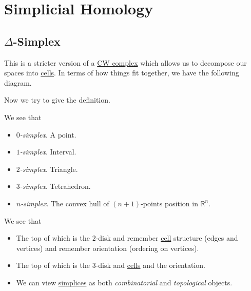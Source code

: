 \section{Simplicial Homology}
\subsection{\(\Delta\)-Simplex}
This is a stricter version of a \hyperref[def:CW-Complex]{CW complex} which allows us to decompose our spaces into \hyperref[def:cell]{cells}.
In terms of how things fit together, we have the following diagram.
\begin{figure}[H]
	\centering
	\label{fig:simplicial-homology-venn-diagram}
\end{figure}

Now we try to give the definition.
\begin{definition}[Simplex]\label{def:simplex}
	We see that
	\begin{itemize}
		\item \emph{\(0\)-simplex}. A point.
		\item \emph{\(1\)-simplex}. Interval.
		\item \emph{\(2\)-simplex}. Triangle.
		\item \emph{\(3\)-simplex}. Tetrahedron.
		\item \emph{\(n\)-simplex}. The convex hull of \((n+1)\)-points position in \(\mathbb{R} ^n\).
	\end{itemize}
	\begin{figure}[H]
		\centering
		\label{fig:def:simplex}
	\end{figure}
\end{definition}
\begin{remark}
	We see that
	\begin{itemize}
		\item The top of which is the \(2\)-disk and remember \hyperref[def:cell]{cell} structure (edges and vertices) and remember orientation (ordering on vertices).
		\item The top of which is the \(3\)-disk and \hyperref[def:cell]{cells} and the orientation.
		\item We can view \hyperref[def:simplex]{simplices} as both \emph{combinatorial} and \emph{topological} objects.
	\end{itemize}
\end{remark}

